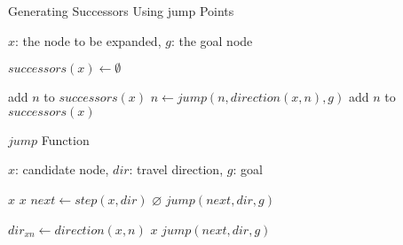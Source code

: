 \begin{algorithm}
\caption{Generating Successors Using jump Points}
\label{alg:jump}
\begin{algorithmic}[1]
\REQUIRE $x$: the node to be expanded, $g$: the goal node 

\STATE $successors(x) \leftarrow \emptyset$

\STATE add $n$ to $successors(x)$ 
\ELSE
\STATE $n \leftarrow jump(n, direction(x, n), g)$
\STATE add $n$ to $successors(x)$
\ENDIF
\ENDFOR

\end{algorithmic}
\end{algorithm}

\begin{algorithm}
\caption{$jump$ Function}
\label{alg:findjump}
\begin{algorithmic}[1]
\REQUIRE $x$: candidate node, $dir$: travel direction, $g$: goal

	\RETURN $x$
\ENDIF
{}
	\RETURN $x$
\ENDIF
\STATE $next \leftarrow step(x, dir)$
	\RETURN $\varnothing$
\ENDIF
{}
	\RETURN $jump(next, dir, g)$
\ENDIF


	\STATE $dir_{xn} \leftarrow direction(x, n)$	
		\RETURN $x$
	\ENDIF
\ENDFOR
\RETURN $jump(next, dir, g)$
\end{algorithmic}
\end{algorithm}
